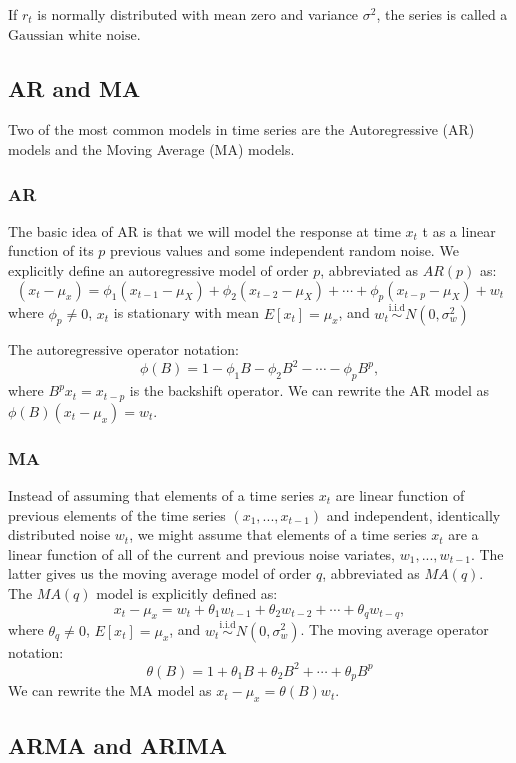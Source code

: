 If $r_t$ is normally distributed with mean zero and variance $\sigma^2$, the series is called a $\mbox{Gaussian white noise}$.

\subsection{AR and MA}
Two of the most common models in time series are the Autoregressive (AR) models and the Moving Average (MA) models.
\subsubsection{AR}
The basic idea of AR is that we will model the response at time $x_t$ t as a linear function of its $p$ previous values and some independent random noise. We explicitly define an autoregressive model of order $p$, abbreviated as $AR (p)$ as:
$$ (x_t - \mu_x) = \phi_1 (x_{t-1} - \mu_X) + \phi_2 (x_{t-2} - \mu_X) + \cdots + \phi_p (x_{t-p} - \mu_X) + w_t$$
where $\phi_p \neq 0$, $x_t$ is stationary with mean $E[x_t] = \mu_x$, and $w_t \overset{\text{i.i.d}}{\sim} N(0, \sigma_w^2)$

The autoregressive operator notation:
$$ \phi(B) = 1 - \phi_1 B -  \phi_2 B^2 - \cdots  -\phi_p B^p,$$
where $B^p x_t = x_{t-p}$ is the backshift operator. We can rewrite the AR model as $ \phi (B)(x_t - \mu_x) = w_t $.

\subsubsection{MA}
Instead of assuming that elements of a time series $x_t$ are linear function of previous elements of the time series $(x_1, . . . , x_{t−1})$ and independent, identically distributed noise $w_t$, we might assume that elements of a time series $x_t$ are a linear function of all of the current and previous noise variates, $w_1, . . . , w_{t−1}$. The latter gives us the moving average model of order $q$, abbreviated as $MA (q)$. The $MA (q)$ model is explicitly defined as:
$$  x_t - \mu_x =  w_t + \theta_1 w_{t-1} + \theta_2 w_{t-2} + \cdots + \theta_q w_{t-q},$$
where $\theta_q \neq 0$, $E[x_t] = \mu_x$, and $w_t \overset{\text{i.i.d}}{\sim} N(0, \sigma_w^2)$. The moving average operator notation: 
$$ \theta (B) = 1 + \theta_1 B + \theta_2 B^2 + \cdots + \theta_p B^p $$We can rewrite the MA model as $ x_t - \mu_x = \theta(B)w_t$.

\subsection{ARMA and ARIMA}
